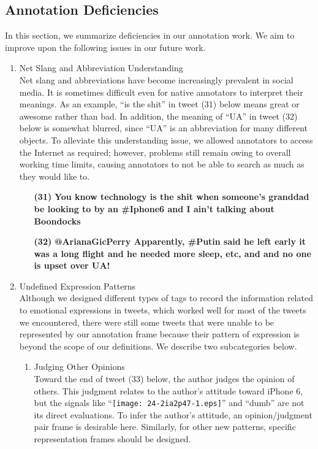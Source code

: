 \documentclass[english]{jnlp_1.4}
\begin{document}
\subsection{Annotation Deficiencies}

In this section, we summarize deficiencies in our annotation work. We aim to improve upon the following issues in our future work.
\begin{enumerate}
\item Net Slang and Abbreviation Understanding\\
Net slang and abbreviations have become increasingly prevalent in social media. It is sometimes difficult even for native annotators to interpret their meanings. As an example, ``is the shit'' in tweet (31) below means great or awesome rather than bad. In addition, the meaning of ``UA'' in tweet (32) below is somewhat blurred, since ``UA'' is an abbreviation for many different objects. To alleviate this understanding issue, we allowed annotators to access the Internet as required; however, problems still remain owing to overall working time limits, causing annotators to not be able to search as much as they would like to.
\begin{enumerate}
\item[{\bf (31)}] {\bf You know technology is the shit when someone's granddad be looking to by an \#Iphone6 and I ain't talking about Boondocks}
\item[{\bf (32)}] {\bf @ArianaGicPerry Apparently, \#Putin said he left early it was a long flight and he needed more sleep, etc, and and no one is upset over UA!}
\end{enumerate}
\item Undefined Expression Patterns\\
Although we designed different types of tags to record the information related to emotional expressions in tweets, which worked well for most of the tweets we encountered, there were still some tweets that were unable to be represented by our annotation frame because their pattern of expression is beyond the scope of our definitions. We describe two subcategories below.
\begin{enumerate}
\item Judging Other Opinions\\
Toward the end of tweet (33) below, the author judges the opinion of others. This judgment relates to the author's attitude toward iPhone 6, but the signals like ``\texttt{[image: 24-2ia2p47-1.eps]}'' and ``dumb'' are not its direct evaluations. To infer the author's attitude, an opinion/judgment pair frame is desirable here. Similarly, for other new patterns, specific representation frames should be designed.

\end{enumerate}
\end{enumerate}
\end{document}
